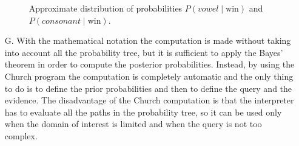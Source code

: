 \begin{itemize}
\begin{figure}[ht!]
            \caption{
                Approximate distribution of probabilities $P(vowel\;|\;\text{win})$ and $P(consonant\;|\;\text{win})$.
            }
            \label{fig:casino-game-f}
        \end{figure}
    \item[G.] With the mathematical notation the computation is made without taking into account all the probability tree, but it is
        sufficient to apply the Bayes' theorem in order to compute the posterior probabilities. Instead, by using the Church program
        the computation is completely automatic and the only thing to do is to define the prior probabilities and then to define the
        query and the evidence. The disadvantage of the Church computation is that the interpreter has to evaluate all the paths in
        the probability tree, so it can be used only when the domain of interest is limited and when the query is not too complex.
\end{itemize}